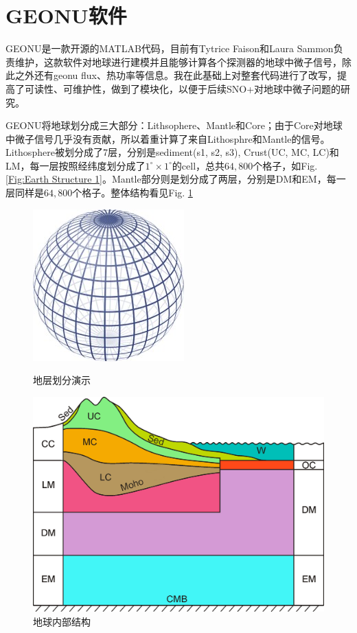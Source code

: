 		\section{GEONU软件}
			GEONU是一款开源的MATLAB代码，目前有Tytrice Faison和Laura Sammon负责维护\cite{Original_GEONU}，这款软件对地球进行建模并且能够计算各个探测器的地球中微子信号，除此之外还有geonu flux、热功率等信息。我在此基础上对整套代码进行了改写，提高了可读性、可维护性，做到了模块化，以便于后续SNO+对地球中微子问题的研究。\par
			GEONU将地球划分成三大部分：Lithsophere、Mantle和Core；由于Core对地球中微子信号几乎没有贡献，所以着重计算了来自Lithosphre和Mantle的信号。Lithosphere被划分成了7层，分别是sediment(s1, s2, s3), Crust(UC, MC, LC)和LM，每一层按照经纬度划分成了$1^\circ \times 1^\circ$的cell，总共$64,800$个格子，如Fig. \ref{Fig:Earth Structure 1}。Mantle部分则是划分成了两层，分别是DM和EM，每一层同样是$64,800$个格子。整体结构看见Fig. \ref{Fig:Earth Structure 2}
				\begin{figure}[H]
					\centering
					\includegraphics[scale = 1]{./Pics/Earth_Structure_1.jpg}
					\caption{地层划分演示}
					\label{Fig:Earth Structure 1}
					\includegraphics[scale = 0.15]{./Pics/Earth_Structure_2.jpg}
					\caption{地球内部结构\cite{huang2013reference}}
					\label{Fig:Earth Structure 2}
				\end{figure}
